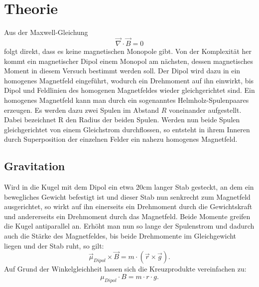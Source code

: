 \newpage					%




\section{Theorie}
Aus der Maxwell-Gleichung
\begin{equation}
\vec{\nabla} \cdot \vec{B} = 0
\end{equation}
 folgt direkt, dass es keine magnetischen Monopole gibt. Von der Komplexität her kommt  ein magnetischer Dipol einem Monopol am nächsten, dessen magnetisches Moment in diesem Versuch bestimmt werden soll.
 Der Dipol wird dazu in ein homogenes Magnetfeld eingeführt, wodurch ein Drehmoment auf ihn einwirkt, bis Dipol und Feldlinien des homogenen Magnetfeldes wieder gleichgerichtet sind.
 Ein homogenes Magnetfeld kann man durch ein sogenanntes Helmholz-Spulenpaares erzeugen. Es werden dazu zwei Spulen im Abstand $R$ voneinander aufgestellt. Dabei bezeichnet R den Radius der beiden Spulen. Werden nun beide Spulen gleichgerichtet von einem Gleichstrom durchflossen, so entsteht in ihrem Inneren durch Superposition der einzelnen Felder ein nahezu homogenes Magnetfeld.
 
 \subsection{Gravitation}
 Wird in die Kugel mit dem Dipol ein etwa 20cm langer Stab gesteckt, an dem ein bewegliches Gewicht befestigt ist und dieser Stab nun senkrecht zum Magnetfeld ausgerichtet, so wirkt auf ihn einerseits ein Drehmoment durch die Gewichtskraft und andererseits ein Drehmoment durch das Magnetfeld. Beide Momente greifen die Kugel antiparallel an. Erhöht man nun so lange der Spulenstrom und dadurch auch die Stärke des Magnetfeldes, bis beide Drehmomente im Gleichgewicht liegen und der Stab ruht,
so gilt:
\begin{equation}
\vec{\mu}_{Dipol} \times \vec{B} = m\cdot (\vec{r} \times \vec{g} ).
\end{equation}
Auf Grund der Winkelgleichheit lassen sich die Kreuzprodukte vereinfachen zu:
\begin{equation}
\mu_{Dipol} \cdot B = m\cdot r \cdot g.
\label{grav}
\end{equation}
  
